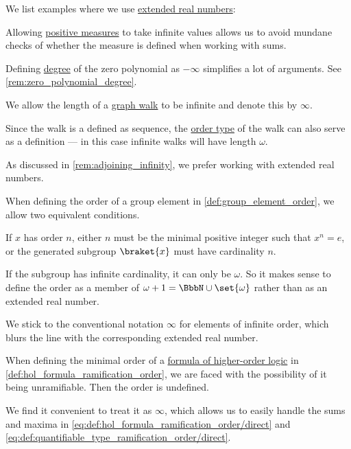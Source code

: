 \begin{example}\label{ex:def:extended_real_numbers}
  We list examples where we use \hyperref[def:extended_real_numbers]{extended real numbers}:
  \begin{thmenum}
     Allowing \hyperref[def:measure/positive]{positive measures} to take infinite values allows us to avoid mundane checks of whether the measure is defined when working with sums.

     Defining \hyperref[def:polynomial_degree]{degree} of the zero polynomial as \( -\infty \) simplifies a lot of arguments. See \cref{rem:zero_polynomial_degree}.

     We allow the length of a \hyperref[def:graph_walk]{graph walk} to be infinite and denote this by \( \infty \).

    Since the walk is a defined as sequence, the \hyperref[def:well_ordered_order_type]{order type} of the walk can also serve as a definition --- in this case infinite walks will have length \( \omega \).

    As discussed in \cref{rem:adjoining_infinity}, we prefer working with extended real numbers.

     When defining the order of a group element in \cref{def:group_element_order}, we allow two equivalent conditions.

    If \( x \) has order \( n \), either \( n \) must be the minimal positive integer such that \( x^n = e \), or the generated subgroup \( \braket{ x } \) must have cardinality \( n \).

    If the subgroup has infinite cardinality, it can only be \( \omega \). So it makes sense to define the order as a member of \( \omega + 1 = \BbbN \cup \set{ \omega } \) rather than as an extended real number.

    We stick to the conventional notation \( \infty \) for elements of infinite order, which blurs the line with the corresponding extended real number.

     When defining the minimal order of a \hyperref[def:hol_expression/formula]{formula of higher-order logic} in \cref{def:hol_formula_ramification_order}, we are faced with the possibility of it being unramifiable. Then the order is undefined.

    We find it convenient to treat it as \( \infty \), which allows us to easily handle the sums and maxima in \eqref{eq:def:hol_formula_ramification_order/direct} and \eqref{eq:def:quantifiable_type_ramification_order/direct}.
  \end{thmenum}
\end{example}

